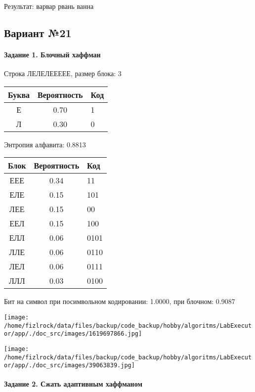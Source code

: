\documentclass[a4paper, 12pt]{article}
\begin{document}
Результат: варвар рвань ванна
\pagebreak
\subsection{Вариант №21}
\paragraph{Задание 1. Блочный хаффман \\}

Строка ЛЕЛЕЛЕЕЕЕЕ, размер блока: 3
\begin{center}
 \begin{tabular}{ |c|c|l| } 
  \hline
     Буква & Вероятность & Код\\ \hline
Е & 0.70 & 1\\\hline
Л & 0.30 & 0
\\ \hline \end{tabular}
\end{center}
Энтропия алфавита: 0.8813
\begin{center}
 \begin{tabular}{ |c|c|l| } 
  \hline
     Блок & Вероятность & Код\\ \hline
ЕЕЕ & 0.34 & 11\\\hline
ЕЛЕ & 0.15 & 101\\\hline
ЛЕЕ & 0.15 & 00\\\hline
ЕЕЛ & 0.15 & 100\\\hline
ЕЛЛ & 0.06 & 0101\\\hline
ЛЛЕ & 0.06 & 0110\\\hline
ЛЕЛ & 0.06 & 0111\\\hline
ЛЛЛ & 0.03 & 0100
\\ \hline \end{tabular}
\end{center}
Бит на символ при посимвольном кодировании: 1.0000, при блочном: 0.9087

\texttt{[image: /home/fizlrock/data/files/backup/code\_backup/hobby/algoritms/LabExecutor/app/./doc\_src/images/1619697866.jpg]}

\texttt{[image: /home/fizlrock/data/files/backup/code\_backup/hobby/algoritms/LabExecutor/app/./doc\_src/images/39063839.jpg]}
\pagebreak
\paragraph{Задание 2. Сжать адаптивным хаффманом\\}
\end{document}
